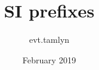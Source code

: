 \documentclass[12pt,a4paper]{article}
\title{SI prefixes}
\author{evt.tamlyn}
\date{February 2019}
\begin{document}
\mbox{}
\vfill

\vfill
 
\vfill

\newpage

\mbox{}
\vfill

\vfill
 
\vfill
\end{document}
